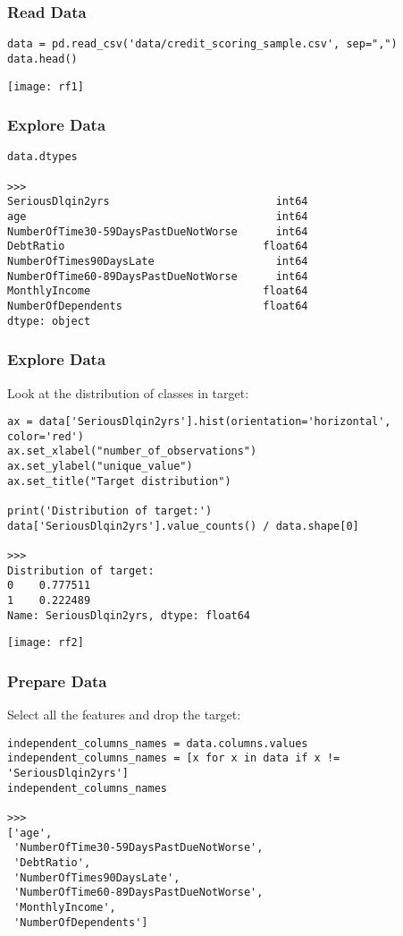 \begin{frame}[fragile]\frametitle{Read Data}
\begin{lstlisting}
data = pd.read_csv('data/credit_scoring_sample.csv', sep=",")
data.head()
\end{lstlisting}
\begin{center}
\texttt{[image: rf1]}
\end{center}
\end{frame}

\begin{frame}[fragile]\frametitle{Explore Data}
\begin{lstlisting}
data.dtypes

>>>
SeriousDlqin2yrs                          int64
age                                       int64
NumberOfTime30-59DaysPastDueNotWorse      int64
DebtRatio                               float64
NumberOfTimes90DaysLate                   int64
NumberOfTime60-89DaysPastDueNotWorse      int64
MonthlyIncome                           float64
NumberOfDependents                      float64
dtype: object
\end{lstlisting}
\end{frame}

\begin{frame}[fragile]\frametitle{Explore Data}
Look at the distribution of classes in target:

\begin{lstlisting}
ax = data['SeriousDlqin2yrs'].hist(orientation='horizontal', color='red')
ax.set_xlabel("number_of_observations")
ax.set_ylabel("unique_value")
ax.set_title("Target distribution")

print('Distribution of target:')
data['SeriousDlqin2yrs'].value_counts() / data.shape[0]

>>>
Distribution of target:
0    0.777511
1    0.222489
Name: SeriousDlqin2yrs, dtype: float64
\end{lstlisting}
\begin{center}
\texttt{[image: rf2]}
\end{center}
\end{frame}

\begin{frame}[fragile]\frametitle{Prepare Data}
Select all the features and drop the target:
\begin{lstlisting}
independent_columns_names = data.columns.values
independent_columns_names = [x for x in data if x != 'SeriousDlqin2yrs']
independent_columns_names

>>>
['age',
 'NumberOfTime30-59DaysPastDueNotWorse',
 'DebtRatio',
 'NumberOfTimes90DaysLate',
 'NumberOfTime60-89DaysPastDueNotWorse',
 'MonthlyIncome',
 'NumberOfDependents']
\end{lstlisting}
\end{frame}



